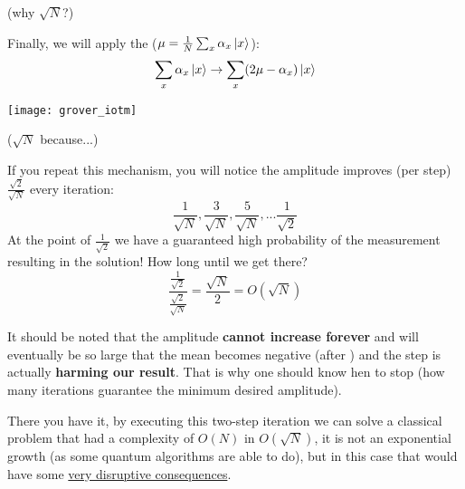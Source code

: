 \documentclass[aspectratio=43]{beamer}
\begin{document}
\begin{frame}{\gvsa (why $\sqrt{N}$?)}
    \begin{cardTiny}
        Finally, we will apply the \iotm ($\mu = \frac{1}{N}\sum_x \alpha_x \ket{x}$):
        \begin{equation*}
            \sum_x \alpha_x \ket{x} \rightarrow \sum_x (2\mu - \alpha_x) \ket{x}
        \end{equation*}
        \begin{center}
            \texttt{[image: grover\_iotm]}
        \end{center}
    \end{cardTiny}
\pagenumber
\end{frame}

\newcommand{\amp}[2]{\frac{#1}{\sqrt{#2}}}
\begin{frame}{\gvsa ($\sqrt{N}$ because...)}
    \begin{card}
        If you repeat this mechanism, you will notice the amplitude improves (per step) $\amp{\sqrt{2}}{N}$ every iteration:
        \begin{equation*}
            \amp{1}{N}, \amp{3}{N}, \amp{5}{N}, ... \amp{1}{2}
        \end{equation*}
        At the point of $\amp{1}{2}$ we have a guaranteed high probability of the measurement resulting in the solution! How long until we get there?
        \begin{equation*}
            \frac{\amp{1}{2}}{\amp{\sqrt{2}}{N}} = \frac{\sqrt{N}}{2} = O(\sqrt{N})
        \end{equation*}
    \end{card}
\pagenumber
\end{frame}

\begin{frame}{\gvsa}
    \begin{cardTiny}
        It should be noted that the amplitude \textbf{cannot increase forever} and will eventually be so large that the mean becomes negative (after \phiv) and the \iotm step is actually \textbf{harming our result}. That is why one should know hen to stop (how many iterations guarantee the minimum desired amplitude).
    \end{cardTiny}
    \begin{cardTiny}
        There you have it, by executing this two-step iteration we can solve a classical problem that had a complexity of $O(N)$ in $O(\sqrt{N})$, it is not an exponential growth (as some quantum algorithms are able to do), but in this case that would have some \href{https://en.wikipedia.org/wiki/P_versus_NP_problem}{very disruptive consequences}. 
    \end{cardTiny}
\pagenumber
\end{frame}
\end{document}
